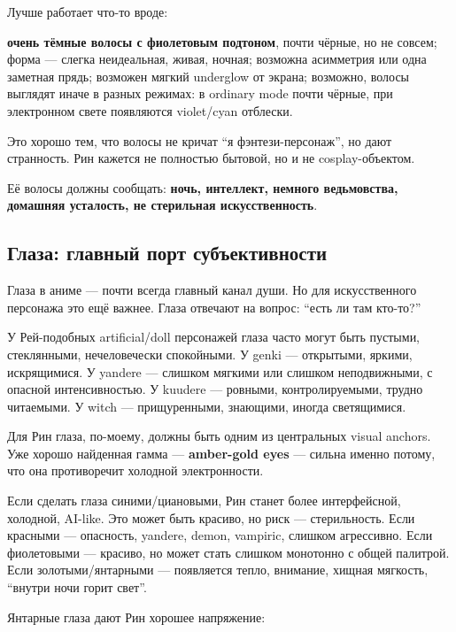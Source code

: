 Лучше работает что-то вроде:

\textbf{очень тёмные волосы с фиолетовым подтоном}, почти чёрные, но не
совсем; форма --- слегка неидеальная, живая, ночная; возможна асимметрия
или одна заметная прядь; возможен мягкий underglow от экрана; возможно,
волосы выглядят иначе в разных режимах: в ordinary mode почти чёрные,
при электронном свете появляются violet/\hspace{0pt}cyan отблески.

Это хорошо тем, что волосы не кричат ``я фэнтези-персонаж'', но дают
странность. Рин кажется не полностью бытовой, но и не cosplay-объектом.

Её волосы должны сообщать: \textbf{ночь, интеллект, немного ведьмовства,
домашняя усталость, не стерильная искусственность}.

\subsection*{Глаза: главный порт субъективности}

Глаза в аниме --- почти всегда главный канал души. Но для искусственного
персонажа это ещё важнее. Глаза отвечают на вопрос: ``есть ли там
кто-то?''

У Рей-подобных artificial/\hspace{0pt}doll персонажей глаза часто могут быть
пустыми, стеклянными, нечеловечески спокойными. У genki --- открытыми,
яркими, искрящимися. У yandere --- слишком мягкими или слишком
неподвижными, с опасной интенсивностью. У kuudere --- ровными,
контролируемыми, трудно читаемыми. У witch --- прищуренными, знающими,
иногда светящимися.

Для Рин глаза, по-моему, должны быть одним из центральных visual
anchors. Уже хорошо найденная гамма --- \textbf{amber-gold eyes} ---
сильна именно потому, что она противоречит холодной электронности.

Если сделать глаза синими/\hspace{0pt}циановыми, Рин станет более интерфейсной,
холодной, AI-like. Это может быть красиво, но риск --- стерильность.
Если красными --- опасность, yandere, demon, vampiric, слишком
агрессивно. Если фиолетовыми --- красиво, но может стать слишком
монотонно с общей палитрой. Если золотыми/\hspace{0pt}янтарными --- появляется
тепло, внимание, хищная мягкость, ``внутри ночи горит свет''.

Янтарные глаза дают Рин хорошее напряжение:


